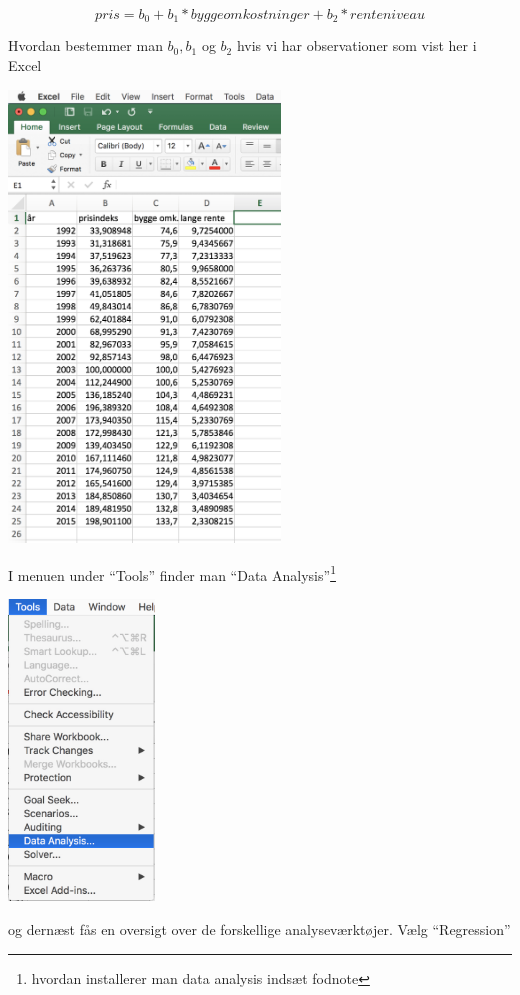 \begin{displaymath}
  pris = b_0 + b_1 * byggeomkostninger + b_2 * renteniveau
\end{displaymath}

Hvordan bestemmer man \(b_0, b_1\) og \(b_2\) hvis vi har observationer som vist her i Excel
\begin{center}
\includegraphics[height=12cm]{excel1.JPG}
\end{center}
I menuen under ``Tools'' finder man ``Data Analysis''\footnote{hvordan installerer man data analysis indsæt fodnote}
\begin{center}
\includegraphics[height=8cm]{menu.JPG}
\end{center}
og dernæst fås en oversigt over de forskellige analyseværktøjer. Vælg ``Regression''
